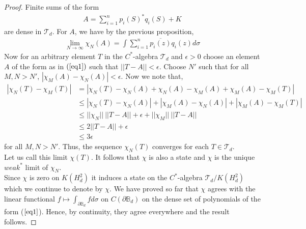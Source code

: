 \documentclass[article]{amsart}
\begin{document}
\begin{proof}

Finite sums of the form 
\begin{align}\label{eq1}
 A = \sum_{i=1}^n p_i(S)^* q_i(S) + K
\end{align}
are dense in $\mathcal{T}_d$. For $A$, we have by the previous proposition,
\begin{align*}
\lim_{N \rightarrow \infty} \chi_N(A) = \int \sum_{i=1}^n \overline{p_i(z)} q_i(z) d\sigma
\end{align*}
Now for an arbitrary element $T$ in the $C^*$-algebra $\mathcal{T}_d$ and $\epsilon >0$ choose an element $A$ of the form as in $(\ref{eq1})$ such that $||T-A|| < \epsilon$. Choose $N'$ such that for all $M,N >N'$, $|\chi_M(A)- \chi_N(A)| < \epsilon$. Now we note that,
\begin{align*}
|\chi_N(T) - \chi_M(T)| & = |\chi_N(T) -\chi_N(A) + \chi_N(A) -\chi_M(A) +\chi_M(A) -\chi_M(T)| \\
& \leq |\chi_N (T)- \chi_N(A)| + |\chi_M(A) -\chi_N(A)| + |\chi_M(A) - \chi_M(T)|\\
& \leq ||\chi_N|| \ ||T-A|| + \epsilon + ||\chi_M|| \ ||T-A||\\
& \leq 2 ||T-A|| + \epsilon\\
& \leq 3 \epsilon
\end{align*}
for all $M,N > N'$. Thus, the sequence $\chi_N(T)$ converges for each $T \in \mathcal{T}_d$.\\ Let us call this limit $\chi(T)$. It follows that $\chi$ is also a state and $\chi$ is the unique $weak^*$ limit of $\chi_N$.\\

Since $\chi$ is zero on $K(H_d^2)$ it induces a state on the $C^*$-algebra $\mathcal{T}_d/K(H_d^2)$ which we continue to denote by $\chi$. We have proved so far that $\chi$ agrees with the linear functional $f \mapsto \int_{\partial \mathbb{B}_d}f d\sigma$ on $C(\partial \mathbb{B}_d)$ on the dense set of polynomials of the form ($\ref{eq1}$). Hence, by continuity, they agree everywhere and the result follows.


\end{proof}
\end{document}
